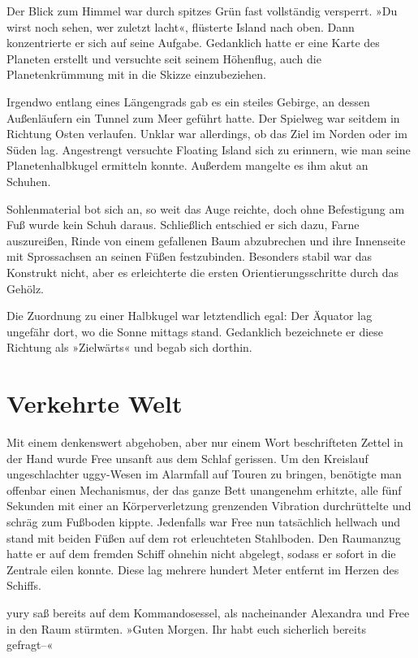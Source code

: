 Der Blick zum Himmel war durch spitzes Grün fast vollständig versperrt. »Du wirst noch sehen, wer zuletzt lacht«, flüsterte Island nach oben. Dann konzentrierte er sich auf seine Aufgabe. Gedanklich hatte er eine Karte des Planeten erstellt und versuchte seit seinem Höhenflug, auch die Planetenkrümmung mit in die Skizze einzubeziehen.

Irgendwo entlang eines Längengrads gab es ein steiles Gebirge, an dessen Außenläufern ein Tunnel zum Meer geführt hatte. Der Spielweg war seitdem in Richtung Osten verlaufen. Unklar war allerdings, ob das Ziel im Norden oder im Süden lag. Angestrengt versuchte Floating Island sich zu erinnern, wie man seine Planetenhalbkugel ermitteln konnte. Außerdem mangelte es ihm akut an Schuhen.

Sohlenmaterial bot sich an, so weit das Auge reichte, doch ohne Befestigung am Fuß wurde kein Schuh daraus. Schließlich entschied er sich dazu, Farne auszureißen, Rinde von einem gefallenen Baum abzubrechen und ihre Innenseite mit Sprossachsen an seinen Füßen festzubinden. Besonders stabil war das Konstrukt nicht, aber es erleichterte die ersten Orientierungsschritte durch das Gehölz.

Die Zuordnung zu einer Halbkugel war letztendlich egal: Der Äquator lag ungefähr dort, wo die Sonne mittags stand. Gedanklich bezeichnete er diese Richtung als »Zielwärts« und begab sich dorthin.


\chapter{Verkehrte Welt}

Mit einem denkenswert abgehoben, aber nur einem Wort beschrifteten Zettel in der Hand wurde Free unsanft aus dem Schlaf gerissen. Um den Kreislauf ungeschlachter uggy-Wesen im Alarmfall auf Touren zu bringen, benötigte man offenbar einen Mechanismus, der das ganze Bett unangenehm erhitzte, alle fünf Sekunden mit einer an Körperverletzung grenzenden Vibration durchrüttelte und schräg zum Fußboden kippte. Jedenfalls war Free nun tatsächlich hellwach und stand mit beiden Füßen auf dem rot erleuchteten Stahlboden. Den Raumanzug hatte er auf dem fremden Schiff ohnehin nicht abgelegt, sodass er sofort in die Zentrale eilen konnte. Diese lag mehrere hundert Meter entfernt im Herzen des Schiffs.


yury saß bereits auf dem Kommandosessel, als nacheinander Alexandra und Free in den Raum stürmten. »Guten Morgen. Ihr habt euch sicherlich bereits gefragt–«

